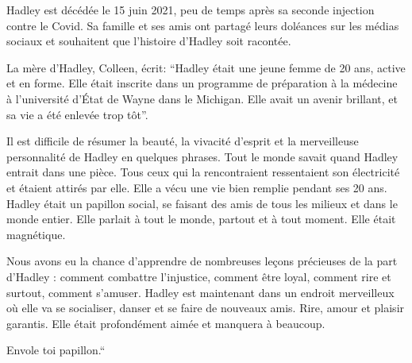 Hadley est décédée le 15 juin 2021, peu de temps après sa seconde injection
contre le Covid. Sa famille et ses amis ont partagé leurs doléances sur les
médias sociaux et souhaitent que l'histoire d'Hadley soit racontée.

La mère d'Hadley, Colleen, écrit: “Hadley était une jeune femme de 20 ans, active
et en forme. Elle était inscrite dans un programme de préparation à la médecine
à l'université d'État de Wayne dans le Michigan. Elle avait un avenir brillant,
et sa vie a été enlevée trop tôt”.

Il est difficile de résumer la beauté, la vivacité d'esprit et la merveilleuse
personnalité de Hadley en quelques phrases. Tout le monde savait quand Hadley
entrait dans une pièce. Tous ceux qui la rencontraient ressentaient son
électricité et étaient attirés par elle. Elle a vécu une vie bien remplie
pendant ses 20 ans. Hadley était un papillon social, se faisant des amis de tous
les milieux et dans le monde entier. Elle parlait à tout le monde, partout et à
tout moment. Elle était magnétique.

Nous avons eu la chance d'apprendre de nombreuses leçons précieuses de la part
d'Hadley : comment combattre l'injustice, comment être loyal, comment rire et
surtout, comment s'amuser. Hadley est maintenant dans un endroit merveilleux où
elle va se socialiser, danser et se faire de nouveaux amis. Rire, amour et
plaisir garantis. Elle était profondément aimée et manquera à beaucoup.

Envole toi papillon.“

